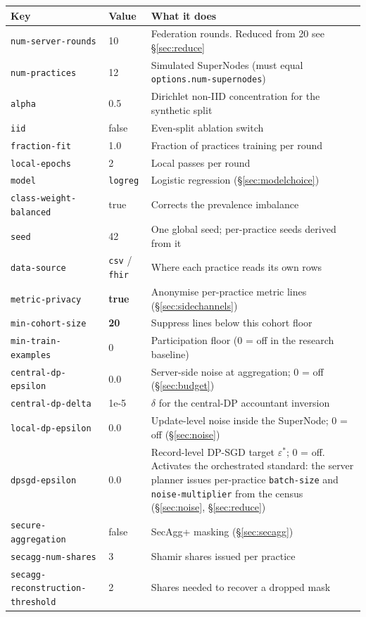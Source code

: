 \begin{center}
\small
\setlength{\tabcolsep}{4pt}
\begin{tabular}{llp{7.4cm}}
  \toprule
  Key & Value & What it does \\
  \midrule
  \texttt{num-server-rounds} & 10 & Federation rounds. Reduced from 20 see \S\ref{sec:reduce} \\
  \texttt{num-practices} & 12 & Simulated SuperNodes (must equal \texttt{options.num-supernodes}) \\
  \texttt{alpha} & 0.5 & Dirichlet non-IID concentration for the synthetic split \\
  \texttt{iid} & false & Even-split ablation switch \\
  \texttt{fraction-fit} & 1.0 & Fraction of practices training per round \\
  \texttt{local-epochs} & 2 & Local passes per round \\
  \texttt{model} & \texttt{logreg} & Logistic regression (\S\ref{sec:modelchoice}) \\
  \texttt{class-weight-balanced} & true & Corrects the prevalence imbalance \\
  \texttt{seed} & 42 & One global seed; per-practice seeds derived from it \\
  \texttt{data-source} & \texttt{csv} / \texttt{fhir} & Where each practice reads its own rows \\
  \midrule
  \texttt{metric-privacy} & \textbf{true} & Anonymise per-practice metric lines (\S\ref{sec:sidechannels}) \\
  \texttt{min-cohort-size} & \textbf{20} & Suppress lines below this cohort floor \\
  \texttt{min-train-examples} & 0 & Participation floor (0 = off in the research baseline) \\
  \texttt{central-dp-epsilon} & 0.0 & Server-side noise at aggregation; 0 = off (\S\ref{sec:budget}) \\
  \texttt{central-dp-delta} & 1e-5 & $\delta$ for the central-DP accountant inversion \\
  \texttt{local-dp-epsilon} & 0.0 & Update-level noise inside the SuperNode; 0 = off (\S\ref{sec:noise}) \\
  \texttt{dpsgd-epsilon} & 0.0 & Record-level DP-SGD target $\varepsilon^{*}$; 0 = off. Activates the
        orchestrated standard: the server planner issues per-practice \texttt{batch-size} and
        \texttt{noise-multiplier} from the census (\S\ref{sec:noise}, \S\ref{sec:reduce}) \\
  \texttt{secure-aggregation} & false & SecAgg+ masking (\S\ref{sec:secagg}) \\
  \texttt{secagg-num-shares} & 3 & Shamir shares issued per practice \\
  \texttt{secagg-reconstruction-threshold} & 2 & Shares needed to recover a dropped mask \\
  \bottomrule
\end{tabular}
\end{center}

